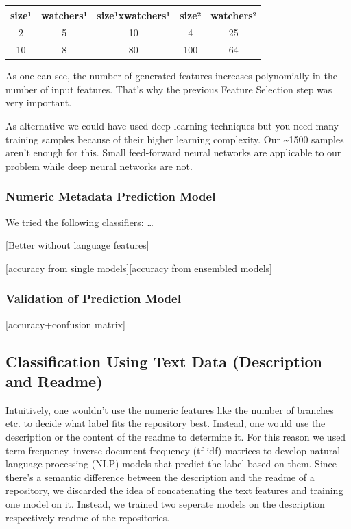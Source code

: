 \documentclass{article}
\begin{document}
\begin{longtable}[]{@{}ccccc@{}}
\toprule
size¹ & watchers¹ & size¹xwatchers¹ & size² & watchers²\tabularnewline
\midrule
\endhead
2 & 5 & 10 & 4 & 25\tabularnewline
10 & 8 & 80 & 100 & 64\tabularnewline
\bottomrule
\end{longtable}

As one can see, the number of generated features increases polynomially
in the number of input features. That's why the previous Feature
Selection step was very important.

As alternative we could have used deep learning techniques but you need
many training samples because of their higher learning complexity. Our
\textasciitilde{}1500 samples aren't enough for this. Small feed-forward
neural networks are applicable to our problem while deep neural networks
are not.

\subsubsection{Numeric Metadata Prediction
Model}\label{numeric-metadata-prediction-model}

We tried the following classifiers: \ldots{}

{[}Better without language features{]}

{[}accuracy from single models{]}{[}accuracy from ensembled models{]}

\subsubsection{Validation of Prediction
Model}\label{validation-of-prediction-model}

{[}accuracy+confusion matrix{]}

\subsection{Classification Using Text Data (Description and
Readme)}\label{classification-using-text-data-description-and-readme}

Intuitively, one wouldn't use the numeric features like the number of
branches etc. to decide what label fits the repository best. Instead,
one would use the description or the content of the readme to determine
it. For this reason we used term frequency--inverse document frequency
(tf-idf) matrices to develop natural language processing (NLP) models
that predict the label based on them. Since there's a semantic
difference between the description and the readme of a repository, we
discarded the idea of concatenating the text features and training one
model on it. Instead, we trained two seperate models on the description
respectively readme of the repositories.
\end{document}
